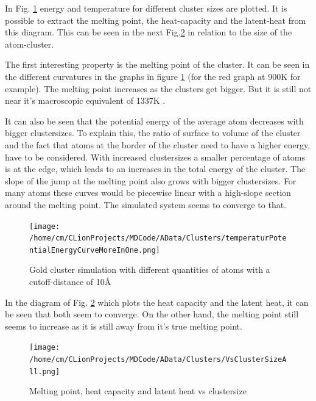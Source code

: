 \par 
In Fig.  \ref{GoldClusterSimulationTemperaturEnergy4In1} energy and temperature for different cluster sizes are plotted. 
It is possible to extract the melting point, the heat-capacity and the latent-heat from this diagram. 
This can be seen in the next Fig.\ref{GoldClusterSimulationVsClustersize} in relation to the size of the atom-cluster.
\par 
The first interesting property is the melting point of the cluster. It can be seen in the different curvatures in the graphs in figure \ref{GoldClusterSimulationTemperaturEnergy4In1} (for the red graph at 900K for example). 
The melting point increases as the clusters get bigger. 
But it is still not near it's macroscopic equivalent of 1337K \cite{Kurzweil2015}. %
\par
It can also be seen that the potential energy of the average atom decreases with bigger clustersizes. 
To explain this, the ratio of surface to volume of the cluster and the fact that atoms at the border of the cluster need to have a higher energy, have to be considered. 
With increased clustersizes a smaller percentage of atoms is at the edge, which leads to an increases in the total energy of the cluster. 
The slope of the jump at the melting point also grows with bigger clustersizes. 
For many atoms these curves would be piecewise linear with a high-slope section around the melting point. 
The simulated system seems to converge to that. 

\begin{figure}
	\begin{center} 
		\texttt{[image: /home/cm/CLionProjects/MDCode/AData/Clusters/temperaturPotentialEnergyCurveMoreInOne.png]} 
	\end{center} 
	\caption[Gold cluster simulation]{Gold cluster simulation with different quantities of atoms with a cutoff-distance of 10\r{A}} 
	\label{GoldClusterSimulationTemperaturEnergy4In1} 
\end{figure} 

In the diagram of Fig. \ref{GoldClusterSimulationVsClustersize} which plots the heat capacity and the latent heat, it can be seen that both seem to converge. On the other hand, the melting point still seems to increase as it is still away from it's true melting point.

\begin{figure}
	\begin{center} 
		\texttt{[image: /home/cm/CLionProjects/MDCode/AData/Clusters/VsClusterSizeAll.png]} 
	\end{center} 
	\caption[Melting point, heat capacity and latent heat vs clustersize]{Melting point, heat capacity and latent heat vs clustersize} 
	\label{GoldClusterSimulationVsClustersize} 
\end{figure} 
